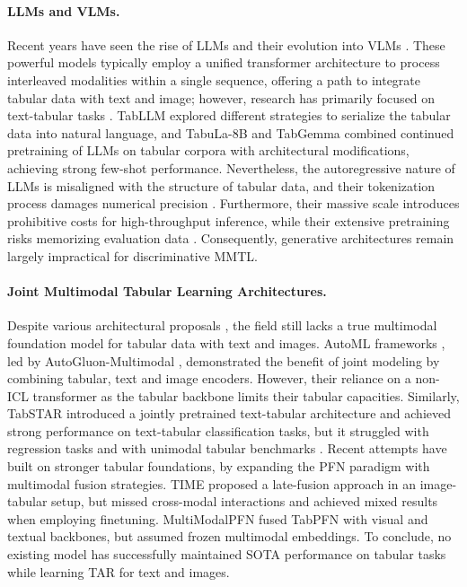 \documentclass{llmxive}
\begin{document}
\paragraph{LLMs and VLMs.} Recent years have seen the rise of LLMs and their evolution into VLMs \cite{wu_multimodal_2023, yin_survey_2024, caffagni_revolution_2024}. These powerful models \cite{singh_openai_2025, comanici_gemini_2025} typically employ a unified transformer architecture \cite{vaswani_attention_2017} to process interleaved modalities within a single sequence, offering a path to integrate tabular data with text and image; however, research has primarily focused on text-tabular tasks \cite{fang_large_2024}. TabLLM \cite{hegselmann_tabllm_2023} explored different strategies to serialize the tabular data into natural language, and TabuLa-8B \cite{gardner_large_2024} and TabGemma \cite{schindler_tabgemma_2025} combined continued pretraining of LLMs on tabular corpora \cite{eggert_tablib_2023} with architectural modifications, achieving strong few-shot performance. Nevertheless, the autoregressive nature of LLMs is misaligned with the structure of tabular data, and their tokenization process damages numerical precision \cite{thawani_representing_2021, spathis_first_2024}. Furthermore, their massive scale introduces prohibitive costs for high-throughput inference, while their extensive pretraining risks memorizing evaluation data \cite{bordt_elephants_2024, gorla_illusion_2026}. Consequently, generative architectures remain largely impractical for discriminative MMTL.

\paragraph{Joint Multimodal Tabular Learning Architectures.} Despite various architectural proposals \cite{hager_best_2023, jiang_tabular_2024, ebrahimi_lanistr_2024, hu_pytorch_2024, leonardis_tip_2025}, the field still lacks a true multimodal foundation model for tabular data with text and images. AutoML \cite{he_automl_2021} frameworks \cite{shi_benchmarking_2021, tang_autogluon-multimodal_2024, tang_bag_2024}, led by AutoGluon-Multimodal \cite{tang_autogluon-multimodal_2024}, demonstrated the benefit of joint modeling by combining tabular, text and image encoders. However, their reliance on a non-ICL transformer \cite{gorishniy_revisiting_2021} as the tabular backbone limits their tabular capacities. Similarly, TabSTAR \cite{arazi_tabstar_2025} introduced a jointly pretrained text-tabular architecture and achieved strong performance on text-tabular classification tasks, but it struggled with regression tasks and with unimodal tabular benchmarks \cite{erickson_tabarena_2025}. Recent attempts have built on stronger tabular foundations, by expanding the PFN paradigm with multimodal fusion strategies. TIME \cite{luo_time_2025} proposed a late-fusion approach in an image-tabular setup, but missed cross-modal interactions and achieved mixed results when employing finetuning. MultiModalPFN \cite{kim_multimodalpfn_2025} fused TabPFN with visual and textual backbones, but assumed frozen multimodal embeddings. To conclude, no existing model has successfully maintained SOTA performance on tabular tasks while learning TAR for text and images.
\end{document}
